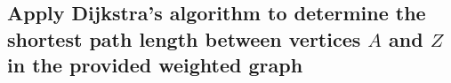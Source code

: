 \documentclass[12pt, a4paper, twoside]{report} %
\begin{document}

\subsection{Apply Dijkstra’s algorithm to determine the shortest path length between vertices \( A \) and \( Z \) in the provided weighted graph}


\end{document}
